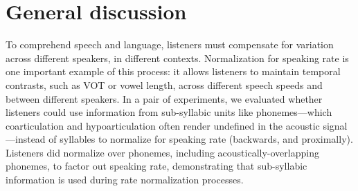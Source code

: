 \documentclass[preprint]{JASA}
\begin{document}


\section{General discussion}

To comprehend speech and language, listeners must compensate for variation across different speakers, in different contexts. Normalization for speaking rate is one important example of this process: it allows listeners to maintain temporal contrasts, such as VOT or vowel length, across different speech speeds and between different speakers. In a pair of experiments, we evaluated whether listeners could use information from sub-syllabic units like phonemes---which coarticulation and hypoarticulation often render undefined in the acoustic signal---instead of syllables to normalize for speaking rate (backwards, and proximally). Listeners did normalize over phonemes, including acoustically-overlapping phonemes, to factor out speaking rate, demonstrating that sub-syllabic information is used during rate normalization processes.
\end{document}
